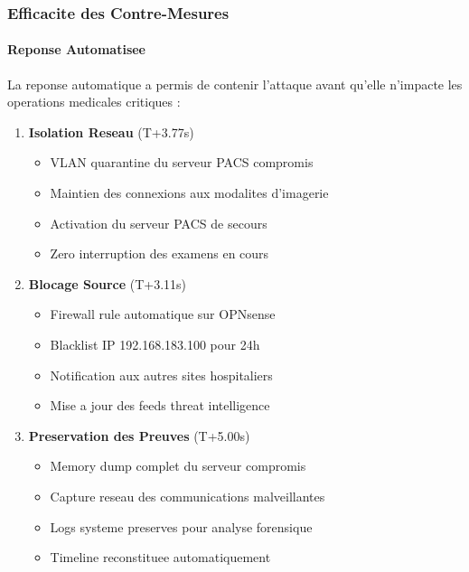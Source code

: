 \subsubsection{Efficacite des Contre-Mesures}

\paragraph{Reponse Automatisee}

La reponse automatique a permis de contenir l'attaque avant qu'elle n'impacte les operations medicales critiques :

\begin{enumerate}
    \item \textbf{Isolation Reseau} (T+3.77s)
          \begin{itemize}
              \item VLAN quarantine du serveur PACS compromis
              \item Maintien des connexions aux modalites d'imagerie
              \item Activation du serveur PACS de secours
              \item Zero interruption des examens en cours
          \end{itemize}

    \item \textbf{Blocage Source} (T+3.11s)
          \begin{itemize}
              \item Firewall rule automatique sur OPNsense
              \item Blacklist IP 192.168.183.100 pour 24h
              \item Notification aux autres sites hospitaliers
              \item Mise a jour des feeds threat intelligence
          \end{itemize}

    \item \textbf{Preservation des Preuves} (T+5.00s)
          \begin{itemize}
              \item Memory dump complet du serveur compromis
              \item Capture reseau des communications malveillantes
              \item Logs systeme preserves pour analyse forensique
              \item Timeline reconstituee automatiquement
          \end{itemize}
\end{enumerate}

